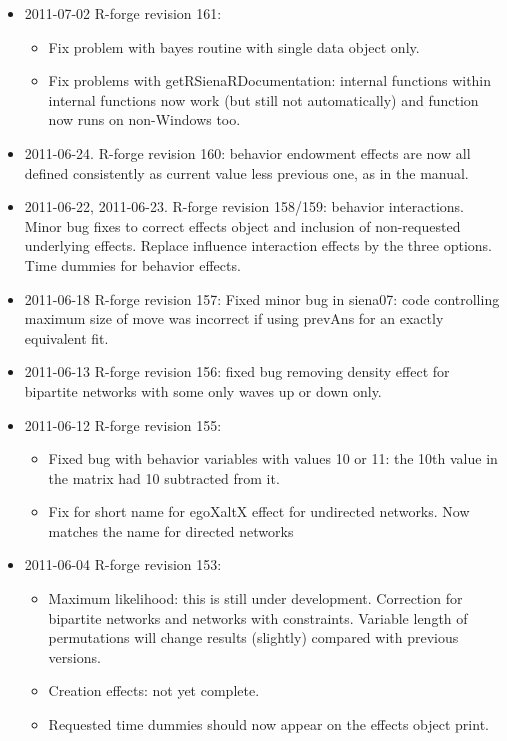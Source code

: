 \documentclass[a4paper,fleqn,11pt]{article}
\newcommand{\+}{\, + \,}
\begin{document}
{\begin{small}
\begin{itemize}
Fix bug in effectsDocumentation, reduce memory size needed for non-ML,
non-finite-difference models.
\item 2011-07-02 R-forge revision 161:
\begin{itemize}
\item Fix problem with bayes routine with single data object only.
\item Fix problems with getRSienaRDocumentation: internal functions within
internal functions  now work (but still not automatically)
and function now runs on non-Windows too.
\end{itemize}
\item 2011-06-24. R-forge revision 160: behavior endowment effects are now
  all defined consistently as current value less previous one, as in the manual.
\item 2011-06-22, 2011-06-23. R-forge revision 158/159: behavior
  interactions. Minor bug fixes to correct effects object and inclusion of
  non-requested underlying effects. Replace influence interaction effects by the
  three options. Time dummies for behavior effects.
\item 2011-06-18 R-forge revision 157: Fixed minor bug in siena07: code
  controlling maximum size of move was incorrect if using prevAns for an exactly
  equivalent fit.
\item 2011-06-13 R-forge revision 156: fixed bug removing density effect for
  bipartite networks with some only waves up or down only.
\item 2011-06-12 R-forge revision 155:
\begin{itemize}
\item Fixed bug with behavior variables with values 10 or 11: the 10th value in
  the matrix had 10 subtracted from it.
\item Fix for short name for egoXaltX effect for undirected networks. Now
  matches the name for directed networks
\end{itemize}
\item 2011-06-04 R-forge revision 153:
\begin{itemize}
\item Maximum likelihood: this is still under development. Correction for
  bipartite networks and networks with constraints. Variable length of
  permutations will change results (slightly) compared with previous versions.
\item Creation effects: not yet complete.
\item Requested time dummies should now appear on the effects object print.

\end{itemize}
\end{itemize}
\end{small}}
\end{document}
